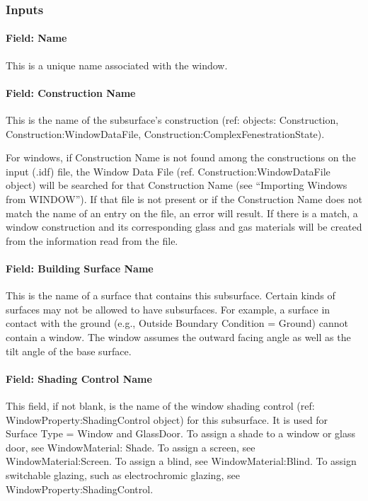\subsubsection{Inputs}\label{inputs-14-016}

\paragraph{Field: Name}\label{field-name-10-018}

This is a unique name associated with the window.

\paragraph{Field: Construction Name}\label{field-construction-name-10}

This is the name of the subsurface's construction (ref: objects: Construction, Construction:WindowDataFile, Construction:ComplexFenestrationState).

For windows, if Construction Name is not found among the constructions on the input (.idf) file, the Window Data File (ref. Construction:WindowDataFile object) will be searched for that Construction Name (see ``Importing Windows from WINDOW''). If that file is not present or if the Construction Name does not match the name of an entry on the file, an error will result. If there is a match, a window construction and its corresponding glass and gas materials will be created from the information read from the file.

\paragraph{Field: Building Surface Name}\label{field-building-surface-name-000}

This is the name of a surface that contains this subsurface. Certain kinds of surfaces may not be allowed to have subsurfaces. For example, a surface in contact with the ground (e.g., Outside Boundary Condition = Ground) cannot contain a window. The window assumes the outward facing angle as well as the tilt angle of the base surface.

\paragraph{Field: Shading Control Name}\label{field-shading-control-name}

This field, if not blank, is the name of the window shading control (ref: WindowProperty:ShadingControl object) for this subsurface. It is used for Surface Type = Window and GlassDoor. To assign a shade to a window or glass door, see WindowMaterial: Shade. To assign a screen, see WindowMaterial:Screen. To assign a blind, see WindowMaterial:Blind. To assign switchable glazing, such as electrochromic glazing, see WindowProperty:ShadingControl.

